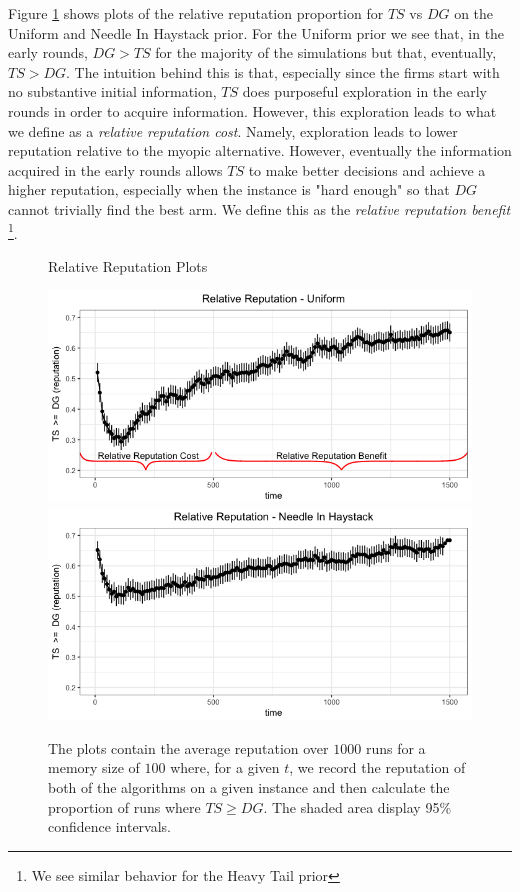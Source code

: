 \documentclass{article}
\theoremstyle{definition}
\begin{document}
Figure \ref{relative_rep_plots} shows plots of the relative reputation proportion for $TS$ vs $DG$ on the Uniform and Needle In Haystack prior. For the Uniform prior we see that, in the early rounds, $DG > TS$ for the majority of the simulations but that, eventually, $TS > DG$. The intuition behind this is that, especially since the firms start with no substantive initial information, $TS$ does purposeful exploration in the early rounds in order to acquire information. However, this exploration leads to what we define as a \textit{relative reputation cost}. Namely, exploration leads to lower reputation relative to the myopic alternative. However, eventually the information acquired in the early rounds allows $TS$ to make better decisions and achieve a higher reputation, especially when the instance is "hard enough" so that $DG$ cannot trivially find the best arm. We define this as the \textit{relative reputation benefit} \footnote{We see similar behavior for the Heavy Tail prior}.

\begin{figure}
\caption{Relative Reputation Plots}
\includegraphics[scale=0.35]{figures/relative_uniform_annotated_plot}
\includegraphics[scale=0.35]{figures/ts_dg_nih_10_prelim}
\caption*{\tiny{The plots contain the average reputation over $1000$ runs for a memory size of $100$ where, for a given $t$, we record the reputation of both of the algorithms on a given instance and then calculate the proportion of runs where $TS \geq DG$. The shaded area display 95\% confidence intervals.}}
\label{relative_rep_plots}

\end{figure}
\end{document}
